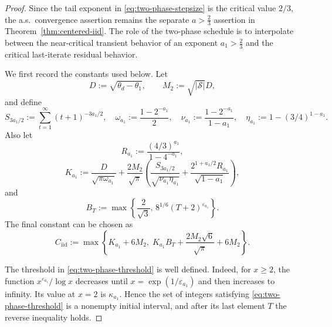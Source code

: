 \documentclass{article}
\newcommand{\X}{\mathcal{S}}
\begin{document}
\begin{proof}
Since the tail exponent in \eqref{eq:two-phase-stepsize} is the critical value $2/3$, the a.s.\ convergence assertion remains the separate $a>\frac23$ assertion in Theorem~\ref{thm:centered-iid}. The role of the two-phase schedule is to interpolate between the near-critical transient behavior of an exponent $a_1>\frac23$ and the critical last-iterate residual behavior.

We first record the constants used below. Let
\begin{equation}
D:=\sqrt{\theta_d-\theta_1},\qquad M_2:=\sqrt{|\X|}D,
\end{equation}
and define
\begin{equation}
S_{3a_1/2}:=\sum_{t=1}^{\infty}(t+1)^{-3a_1/2},\quad \omega_{a_1}:=\frac{1-2^{-a_1}}{2},\quad \nu_{a_1}:=\frac{1-2^{-a_1}}{1-a_1},\quad \eta_{a_1}:=1-(3/4)^{1-a_1}.
\end{equation}
Also let
\begin{equation}
R_{a_1}:=\frac{(4/3)^{a_1}}{1-4^{-a_1}},
\end{equation}
\begin{equation}
K_{a_1}:=\frac{D}{\sqrt{\pi\omega_{a_1}}} +\frac{2M_2}{\sqrt{\pi}}\left(\frac{S_{3a_1/2}}{\sqrt{\nu_{a_1}\eta_{a_1}}} +\frac{2^{1+a_1/2}R_{a_1}}{\sqrt{1-a_1}}\right),
\end{equation}
and
\begin{equation}
B_T:=\max\left\{\frac{2}{\sqrt3},\,8^{1/6}(T+2)^{\varepsilon_{a_1}}\right\}.
\end{equation}
The final constant can be chosen as
\begin{equation}\label{eq:two-phase-constant}
C_{\mathrm{iid}}:=\max\left\{K_{a_1}+6M_2,\; K_{a_1}B_T+\frac{2M_2\sqrt6}{\sqrt{\pi}}+6M_2\right\}.
\end{equation}

The threshold in \eqref{eq:two-phase-threshold} is well defined. Indeed, for $x\ge2$, the function $x^{\varepsilon_{a_1}}/\log x$ decreases until $x=\exp(1/\varepsilon_{a_1})$ and then increases to infinity. Its value at $x=2$ is $\kappa_{a_1}$. Hence the set of integers satisfying \eqref{eq:two-phase-threshold} is a nonempty initial interval, and after its last element $T$ the reverse inequality holds.


\end{proof}
\end{document}
